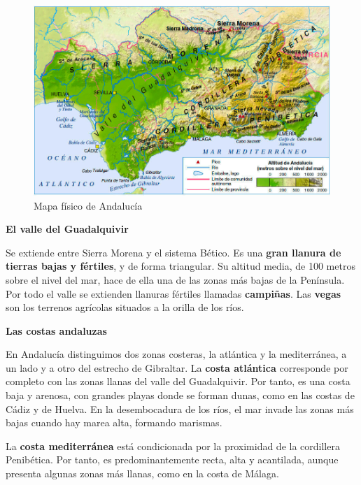 \begin{figure}[!ht]
    \centering
    \includegraphics[width=0.7\linewidth]{Tema2/05_mapa-fisico-andalucia.jpg}
    \caption{Mapa físico de Andalucía}
    \label{fig:mapa-fisico-andalucia}
\end{figure}

\textbf{El valle del Guadalquivir}

\vspace{3mm}
Se extiende entre Sierra Morena y el sistema Bético. Es una \textbf{gran llanura de tierras bajas y fértiles}, y de forma triangular. Su altitud media, de 100 metros sobre el nivel del mar, hace de ella una de las zonas más bajas de la Península. Por todo el valle se extienden llanuras fértiles llamadas \textbf{campiñas}. Las \textbf{vegas} son los terrenos agrícolas situados a la orilla de los ríos.

\vspace{3mm}
\textbf{Las costas andaluzas}

\vspace{3mm}
En Andalucía distinguimos dos zonas costeras, la atlántica y la mediterránea, a un lado y a otro del estrecho de Gibraltar. La \textbf{costa atlántica} corresponde por completo con las zonas llanas del valle del Guadalquivir. Por tanto, es una costa baja y arenosa, con grandes playas donde se forman dunas, como en las costas de Cádiz y de Huelva. En la desembocadura de los ríos, el mar invade las zonas más bajas cuando hay marea alta, formando marismas.

\vspace{3mm}
La \textbf{costa mediterránea} está condicionada por la proximidad de la cordillera Penibética. Por tanto, es predominantemente recta, alta y acantilada, aunque presenta algunas zonas más llanas, como en la costa de Málaga.